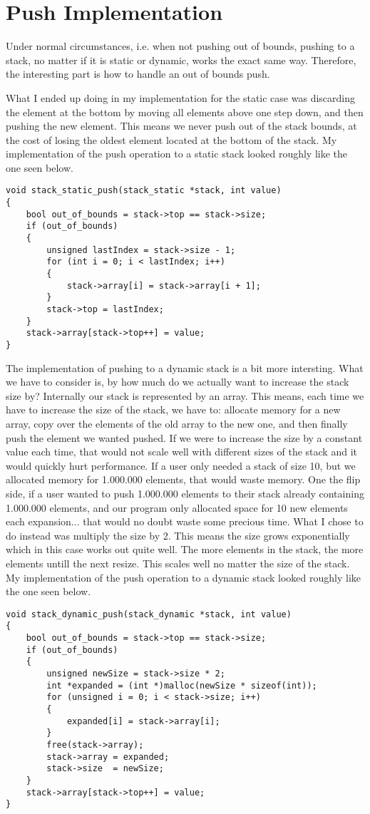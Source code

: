 \documentclass[a4paper, 11pt]{article}
\begin{document}
\section {Push Implementation}
	Under normal circumstances, i.e. when not pushing out of bounds, pushing to a stack, no matter if it is static or dynamic, works the exact same way.
	Therefore, the interesting part is how to handle an out of bounds push.
	\par
	What I ended up doing in my implementation for the static case was discarding the element at the bottom by
	moving all elements above one step down, and then pushing the new element.
	This means we never push out of the stack bounds, at the cost of losing the oldest element located at the bottom of the stack.
	My implementation of the push operation to a static stack looked roughly like the one seen below.
	\begin{verbatim}
void stack_static_push(stack_static *stack, int value)
{
	bool out_of_bounds = stack->top == stack->size;
	if (out_of_bounds)
	{
		unsigned lastIndex = stack->size - 1;
		for (int i = 0; i < lastIndex; i++)
		{
			stack->array[i] = stack->array[i + 1];
		}
		stack->top = lastIndex;
	}
	stack->array[stack->top++] = value;
}
	\end{verbatim}
	The implementation of pushing to a dynamic stack is a bit more intersting.
	What we have to consider is, by how much do we actually want to increase the stack size by?
	Internally our stack is represented by an array.
	This means, each time we have to increase the size of the stack, we have to:
	allocate memory for a new array, copy over the elements of the old array to the new one, and then finally push the element we wanted pushed.
	If we were to increase the size by a constant value each time, that would not scale well with different sizes of the stack and it would quickly hurt performance.
	If a user only needed a stack of size 10, but we allocated memory for 1.000.000 elements, that would waste memory.
	One the flip side, if a user wanted to push 1.000.000 elements to their stack already containing 1.000.000 elements,
	and our program only allocated space for 10 new elements each expansion... that would no doubt waste some precious time.
	What I chose to do instead was multiply the size by 2.
	This means the size grows exponentially which in this case works out quite well.
	The more elements in the stack, the more elements untill the next resize.
	This scales well no matter the size of the stack.
	My implementation of the push operation to a dynamic stack looked roughly like the one seen below.
	\begin{verbatim}
void stack_dynamic_push(stack_dynamic *stack, int value)
{
	bool out_of_bounds = stack->top == stack->size;
	if (out_of_bounds)
	{
		unsigned newSize = stack->size * 2;
		int *expanded = (int *)malloc(newSize * sizeof(int));
		for (unsigned i = 0; i < stack->size; i++)
		{
			expanded[i] = stack->array[i];
		}
		free(stack->array);
		stack->array = expanded;
		stack->size  = newSize;
	}
	stack->array[stack->top++] = value;
}
	\end{verbatim}
\end{document}
